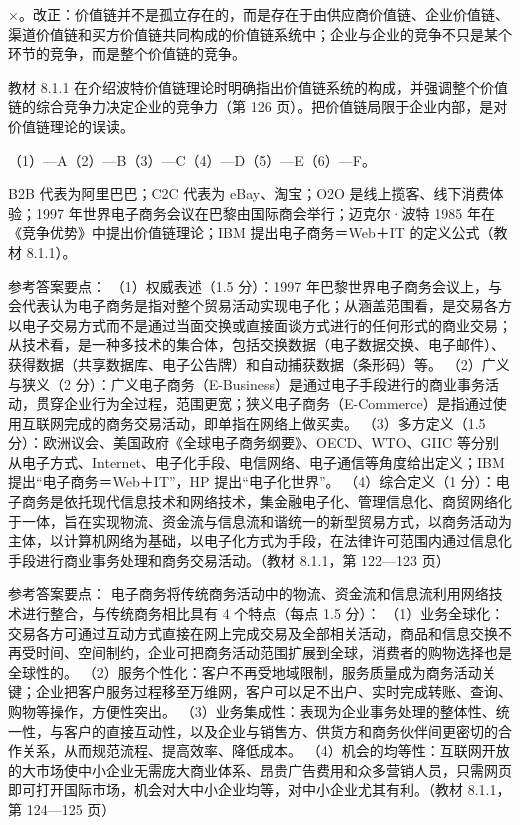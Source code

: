 \documentclass[a4paper,11pt]{article}
\begin{document}
\q ×。改正：价值链并不是孤立存在的，而是存在于由供应商价值链、企业价值链、渠道价值链和买方价值链共同构成的价值链系统中；企业与企业的竞争不只是某个环节的竞争，而是整个价值链的竞争。\begin{analysis}教材 8.1.1 在介绍波特价值链理论时明确指出价值链系统的构成，并强调整个价值链的综合竞争力决定企业的竞争力（第 126 页）。把价值链局限于企业内部，是对价值链理论的误读。\end{analysis}


\q （1）—A\quad （2）—B\quad （3）—C\quad （4）—D\quad （5）—E\quad （6）—F。
\begin{analysis}B2B 代表为阿里巴巴；C2C 代表为 eBay、淘宝；O2O 是线上揽客、线下消费体验；1997 年世界电子商务会议在巴黎由国际商会举行；迈克尔·波特 1985 年在《竞争优势》中提出价值链理论；IBM 提出电子商务＝Web＋IT 的定义公式（教材 8.1.1）。\end{analysis}


\q 参考答案要点：
（1）权威表述（1.5 分）：1997 年巴黎世界电子商务会议上，与会代表认为电子商务是指对整个贸易活动实现电子化；从涵盖范围看，是交易各方以电子交易方式而不是通过当面交换或直接面谈方式进行的任何形式的商业交易；从技术看，是一种多技术的集合体，包括交换数据（电子数据交换、电子邮件）、获得数据（共享数据库、电子公告牌）和自动捕获数据（条形码）等。
（2）广义与狭义（2 分）：广义电子商务（E-Business）是通过电子手段进行的商业事务活动，贯穿企业行为全过程，范围更宽；狭义电子商务（E-Commerce）是指通过使用互联网完成的商务交易活动，即单指在网络上做买卖。
（3）多方定义（1.5 分）：欧洲议会、美国政府《全球电子商务纲要》、OECD、WTO、GIIC 等分别从电子方式、Internet、电子化手段、电信网络、电子通信等角度给出定义；IBM 提出“电子商务＝Web＋IT”，HP 提出“电子化世界”。
（4）综合定义（1 分）：电子商务是依托现代信息技术和网络技术，集金融电子化、管理信息化、商贸网络化于一体，旨在实现物流、资金流与信息流和谐统一的新型贸易方式，以商务活动为主体，以计算机网络为基础，以电子化方式为手段，在法律许可范围内通过信息化手段进行商业事务处理和商务交易活动。（教材 8.1.1，第 122—123 页）

\q 参考答案要点：
电子商务将传统商务活动中的物流、资金流和信息流利用网络技术进行整合，与传统商务相比具有 4 个特点（每点 1.5 分）：
（1）业务全球化：交易各方可通过互动方式直接在网上完成交易及全部相关活动，商品和信息交换不再受时间、空间制约，企业可把商务活动范围扩展到全球，消费者的购物选择也是全球性的。
（2）服务个性化：客户不再受地域限制，服务质量成为商务活动关键；企业把客户服务过程移至万维网，客户可以足不出户、实时完成转账、查询、购物等操作，方便性突出。
（3）业务集成性：表现为企业事务处理的整体性、统一性，与客户的直接互动性，以及企业与销售方、供货方和商务伙伴间更密切的合作关系，从而规范流程、提高效率、降低成本。
（4）机会的均等性：互联网开放的大市场使中小企业无需庞大商业体系、昂贵广告费用和众多营销人员，只需网页即可打开国际市场，机会对大中小企业均等，对中小企业尤其有利。（教材 8.1.1，第 124—125 页）
\end{document}
